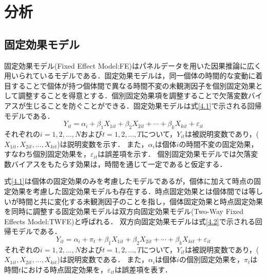 \chapter{分析}

\section{固定効果モデル}
固定効果モデル(Fixed Effect Model:FE)はパネルデータを用いた因果推論に広く用いられているモデルである．固定効果モデルは，同一個体の時間的な変動に着目することで個体が持つ個体間で異なる時間不変の未観測因子を個別固定効果として調整することを得意とする．個別固定効果項を調整することで欠落変数バイアスが生じることを防ぐことができる．固定効果モデルは式\ref{4.1}で示される回帰モデルである．
\begin{equation}
  Y_{it} = \alpha_{i} + \beta_{1}X_{1it} + \beta_{2}X_{2it} + \cdots  + \beta_{k}X_{kit} + \varepsilon_{it}
  \label{4.1}
\end{equation}
それぞれの$i=1,2,...,N$および$t=1,2,...,T$について，$Y_{it}$は被説明変数であり，($X_{1it},X_{2it},...,X_{kit}$)は説明変数を示す．
また，$\alpha_{i}$は個体$i$の時間不変の固定効果，すなわち個別固定効果を，$\varepsilon_{it}$は誤差項を示す．
個別固定効果モデルでは欠落変数バイアスをもたらす効果は，時間を通じて一定であると仮定する．

式\ref{4.1}は個体の固定効果のみを考慮したモデルであるが，個体に加えて時点の固定効果を考慮した固定効果モデルも存在する．時点固定効果とは個体間では等しいが時間と共に変化する未観測因子のことを指し，個体固定効果と時点固定効果を同時に調整する固定効果モデルは双方向固定効果モデル(Two-Way Fixed Effects Model:TWFE)と呼ばれる．
双方向固定効果モデルは式\ref{4.2}で示される回帰モデルである．
\begin{equation}
  Y_{it} = \alpha_{i} + \pi_{t} + \beta_{1}X_{1it} + \beta_{2}X_{2it} + \cdots  + \beta_{k}X_{kit} + \varepsilon_{it}
  \label{4.2}
\end{equation}
それぞれの$i=1,2,...,N$および$t=1,2,...,T$について，$Y_{it}$は被説明変数であり，($X_{1it},X_{2it},...,X_{kit}$)は説明変数である．
また，$\alpha_{i}$は個体$i$の個別固定効果を，$\pi_{t}$は時間$t$における時点固定効果を，$\varepsilon_{it}$は誤差項を表す．

